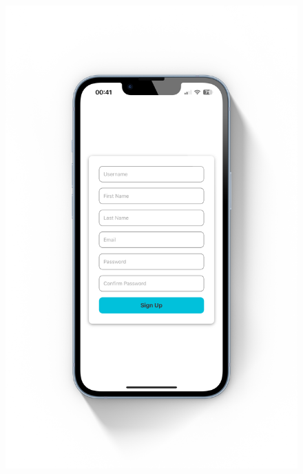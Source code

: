\begin{figure}[!ht]
    \centering
    \begin{minipage}{0.5\textwidth}
        \centering
        \includegraphics[scale=0.08]{LATEX/Appendices/Images/Software/Frontend/sign_up_screen_1.png}
        \label{fig:sign up screen 1}
    \end{minipage}\hfill %
    \begin{minipage}{0.5\textwidth}
         \centering

\end{minipage}
\end{figure}
